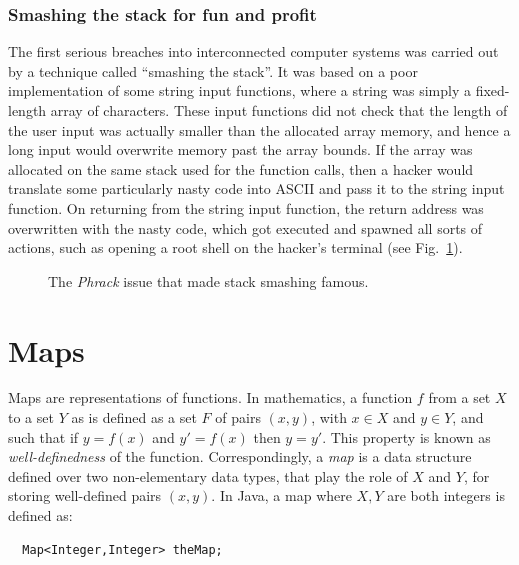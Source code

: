 \documentclass[a4paper]{book}
\theoremstyle{changebreak}                %
\begin{document}
\subsubsection{Smashing the stack for fun and profit}
The first serious breaches into interconnected computer systems was
carried out by a technique called ``smashing the
stack''. It was based on a poor implementation
of some string input functions, where a string was simply
a fixed-length array of characters. These input
functions did not check that the length of the
user input was actually smaller than the allocated array
memory, and hence a long input would overwrite
memory past the array bounds. If the array was
allocated on the same stack used for the function calls, then a hacker
would translate some particularly nasty code into ASCII
and pass it to the string input function. On returning from the string
input function, the return address was
overwritten with the nasty code, which got executed and spawned all
sorts of actions, such as opening a root shell on
the hacker's terminal (see Fig.~\ref{f:smashstack}).

\begin{figure}[!ht]
\begin{center}
\end{center}
\caption{The {\it Phrack} issue that made stack smashing famous.}
\label{f:smashstack}
\end{figure}

\section{Maps}
\label{s:linear:map}
Maps are representations of functions. In mathematics, a
function $f$ from a set $X$ to a set $Y$ as
is defined as a set $F$ of pairs $(x,y)$, with $x\in X$
and $y\in Y$, and such that if $y=f(x)$ and $y'=f(x)$ then
$y=y'$. This property is known as {\it
  well-definedness} of the
function. Correspondingly, a {\it map} is a data
structure defined over two non-elementary data
types, that play the role of $X$ and
$Y$, for storing well-defined pairs $(x,y)$. In
Java, a map where $X,Y$ are both integers is defined as:
\begin{verbatim}
  Map<Integer,Integer> theMap;
\end{verbatim}
\end{document}
